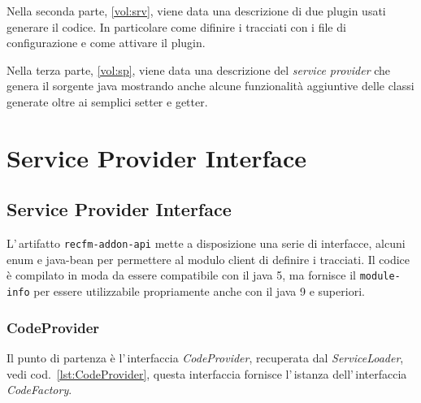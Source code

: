 \documentclass[a4paper,10pt]{report}
\begin{document}
Nella seconda parte, \ref{vol:srv}, viene data una descrizione di due plugin 
usati generare il codice.
In particolare come difinire i tracciati con i file di configurazione e come 
attivare il plugin.

Nella terza parte, \ref{vol:sp}, viene data una descrizione del \textsl{service 
provider} che genera il sorgente java mostrando anche alcune funzionalità 
aggiuntive delle classi generate oltre ai semplici setter e getter.


%

\clearpage

\tableofcontents

\clearpage

\part{Service Provider Interface}\label{vol:spi}

%                                           

\chapter{Service Provider Interface}
L'\,artifatto \verb!recfm-addon-api! mette a disposizione una serie di 
interfacce, alcuni enum e java-bean per permettere al modulo client di definire
i tracciati. 
Il codice è compilato in moda da essere compatibile con il java 5, ma fornisce
il \verb!module-info! per essere utilizzabile propriamente anche con il java 9
e superiori.

\section{CodeProvider}
Il punto di partenza è l'\,interfaccia \textsl{CodeProvider}, recuperata dal
\textsl{ServiceLoader}, vedi cod.~\ref{lst:CodeProvider}, 
questa interfaccia fornisce l'\,istanza 
dell'\,in\-ter\-fac\-cia \textsl{CodeFactory}.
\end{document}

